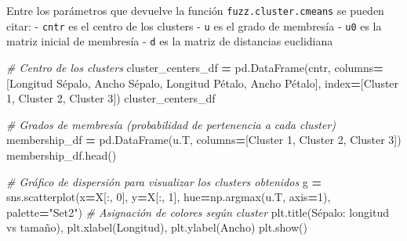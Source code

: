 \documentclass[
  a4paper,
  DIV=11,
  numbers=noendperiod]{scrreprt}
\newenvironment{Shaded}{\begin{snugshade}}{\end{snugshade}}
\newcommand{\CommentTok}[1]{\textcolor[rgb]{0.56,0.35,0.01}{\textit{#1}}}
\newcommand{\DecValTok}[1]{\textcolor[rgb]{0.00,0.00,0.81}{#1}}
\newcommand{\NormalTok}[1]{#1}
\newcommand{\OperatorTok}[1]{\textcolor[rgb]{0.81,0.36,0.00}{\textbf{#1}}}
\newcommand{\StringTok}[1]{\textcolor[rgb]{0.31,0.60,0.02}{#1}}
\begin{document}
Entre los parámetros que devuelve la función
\texttt{fuzz.cluster.cmeans} se pueden citar: - \texttt{cntr} es el
centro de los clusters - \texttt{u} es el grado de membresía -
\texttt{u0} es la matriz inicial de membresía - \texttt{d} es la matriz
de distancias euclidiana

\begin{Shaded}
\begin{Highlighting}[numbers=left,,]
\CommentTok{\# Centro de los clusters}
\NormalTok{cluster\_centers\_df }\OperatorTok{=}\NormalTok{ pd.DataFrame(cntr, columns}\OperatorTok{=}\NormalTok{[}\StringTok{\textquotesingle{}Longitud Sépalo\textquotesingle{}}\NormalTok{, }\StringTok{\textquotesingle{}Ancho Sépalo\textquotesingle{}}\NormalTok{, }\StringTok{\textquotesingle{}Longitud Pétalo\textquotesingle{}}\NormalTok{, }\StringTok{\textquotesingle{}Ancho Pétalo\textquotesingle{}}\NormalTok{],}
\NormalTok{                                  index}\OperatorTok{=}\NormalTok{[}\StringTok{\textquotesingle{}Cluster 1\textquotesingle{}}\NormalTok{, }\StringTok{\textquotesingle{}Cluster 2\textquotesingle{}}\NormalTok{, }\StringTok{\textquotesingle{}Cluster 3\textquotesingle{}}\NormalTok{])}
\NormalTok{cluster\_centers\_df}
\end{Highlighting}
\end{Shaded}

\begin{Shaded}
\begin{Highlighting}[numbers=left,,]
\CommentTok{\# Grados de membresía (probabilidad de pertenencia a cada cluster)}
\NormalTok{membership\_df }\OperatorTok{=}\NormalTok{ pd.DataFrame(u.T, columns}\OperatorTok{=}\NormalTok{[}\StringTok{\textquotesingle{}Cluster 1\textquotesingle{}}\NormalTok{, }\StringTok{\textquotesingle{}Cluster 2\textquotesingle{}}\NormalTok{, }\StringTok{\textquotesingle{}Cluster 3\textquotesingle{}}\NormalTok{])}
\NormalTok{membership\_df.head()}
\end{Highlighting}
\end{Shaded}

\begin{Shaded}
\begin{Highlighting}[numbers=left,,]
\CommentTok{\# Gráfico de dispersión para visualizar los clusters obtenidos}
\NormalTok{g }\OperatorTok{=}\NormalTok{ sns.scatterplot(x}\OperatorTok{=}\NormalTok{X[:, }\DecValTok{0}\NormalTok{], y}\OperatorTok{=}\NormalTok{X[:, }\DecValTok{1}\NormalTok{], hue}\OperatorTok{=}\NormalTok{np.argmax(u.T, axis}\OperatorTok{=}\DecValTok{1}\NormalTok{), palette}\OperatorTok{=}\StringTok{"Set2"}\NormalTok{)  }\CommentTok{\# Asignación de colores según cluster}
\NormalTok{plt.title(}\StringTok{\textquotesingle{}Sépalo: longitud vs tamaño\textquotesingle{}}\NormalTok{), plt.xlabel(}\StringTok{\textquotesingle{}Longitud\textquotesingle{}}\NormalTok{), plt.ylabel(}\StringTok{\textquotesingle{}Ancho\textquotesingle{}}\NormalTok{)}
\NormalTok{plt.show()}
\end{Highlighting}
\end{Shaded}
\end{document}
